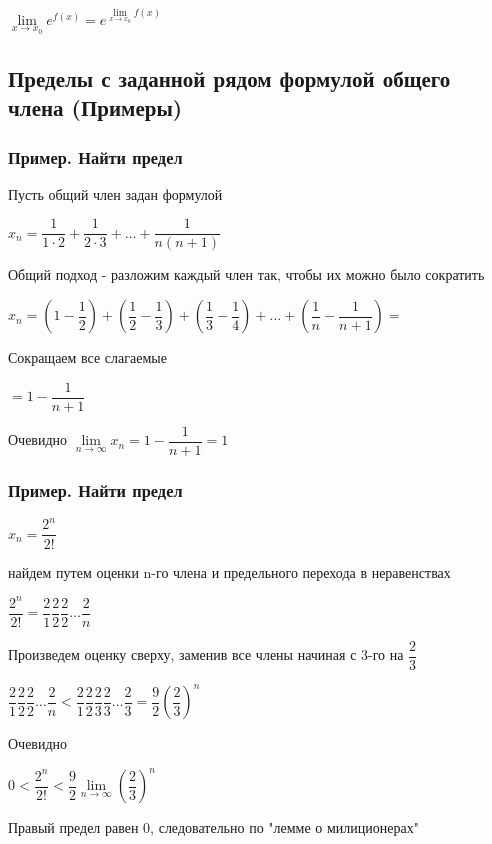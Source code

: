 $ \lim\limits_{x\to x_0} e^{f(x)} =  e^ {\lim\limits_{x\to x_0} {f(x)} }  $

\subsection{Пределы с заданной рядом формулой общего члена (Примеры)}

\subsubsection{Пример. Найти предел}

Пусть общий член задан формулой

$ x_{n} = \dfrac{1}{1 \cdot 2} + \dfrac{1}{2 \cdot 3} + \ldots + \dfrac{1}{n (n+1)}$

Общий подход - разложим каждый член так, чтобы их можно было сократить

$ x_{n} =  \left( 1 - \dfrac{1}{2} \right) +
\left(  \dfrac{1}{2} - \dfrac{1}{3} \right) +
\left(  \dfrac{1}{3} - \dfrac{1}{4} \right) +
\ldots +
\left(  \dfrac{1}{n} - \dfrac{1}{n+1} \right) =
 $
 
 Сокращаем все слагаемые
 
 $ = 1 - \dfrac{1}{n+1} $
 
 Очевидно $ \lim\limits_{n \to \infty} x_{n} = 1 - \dfrac{1}{n+1} = 1 $

\subsubsection{Пример. Найти предел}

$ x_{n} = \dfrac{2^{n}}{2!} $

найдем путем оценки n-го члена и предельного перехода в неравенствах

$ \dfrac{2^{n}}{2!} = \dfrac{2}{1}\dfrac{2}{2}\dfrac{2}{2} \ldots \dfrac{2}{n} $

Произведем оценку сверху, заменив все члены начиная с 3-го на $ \dfrac{2}{3} $

$ \dfrac{2}{1}\dfrac{2}{2}\dfrac{2}{2} \ldots \dfrac{2}{n} <
\dfrac{2}{1}\dfrac{2}{2}\dfrac{2}{3}\dfrac{2}{3} \ldots \dfrac{2}{3} = 
\dfrac{9}{2} \left( \dfrac{2}{3} \right)^{n}
$

Очевидно

$ 0 < \dfrac{2^{n}}{2!} < \dfrac{9}{2} \lim\limits_{n \to \infty} \left( \dfrac{2}{3} \right)^{n} $

Правый предел равен 0, следовательно по "лемме о милиционерах"

